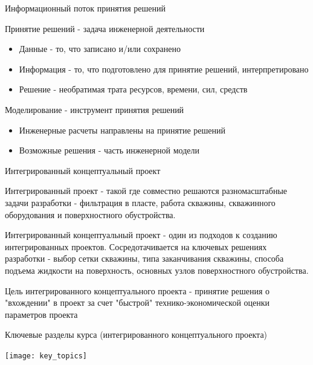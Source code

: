 \begin{frame}{Информационный поток принятия решений}
\begin{center}
    

Принятие решений - задача инженерной деятельности
\end{center}
\begin{itemize}
    \item Данные - то, что записано и/или сохранено
    \item Информация - то, что подготовлено для принятие решений, интерпретировано
    \item Решение - необратимая трата ресурсов, времени, сил, средств
\end{itemize}{}

\end{frame}

\begin{frame}{Моделирование - инструмент принятия решений}
\begin{center}
    
\end{center}
\begin{itemize}
    \item Инженерные расчеты направлены на принятие решений
    \item Возможные решения - часть инженерной модели
\end{itemize}{}

\end{frame}

\begin{frame}{Интегрированный концептуальный проект}

Интегрированный проект - такой где совместно решаются разномасштабные задачи разработки - фильтрация в пласте, работа скважины, скважинного оборудования и поверхностного обустройства.

Интегрированный концептуальный проект - один из подходов к созданию интегрированных проектов. Сосредотачивается на ключевых решениях разработки - выбор сетки скважины, типа заканчивания скважины, способа подъема жидкости на поверхность, основных узлов поверхностного обустройства.

Цель интегрированного концептуального проекта - принятие решения о "вхождении" в проект за счет "быстрой" технико-экономической оценки параметров проекта


\end{frame}




\begin{frame}{Ключевые разделы курса (интегрированного концептуального проекта)}

\begin{center}
    \texttt{[image: key\_topics]}
\end{center}

    
\end{frame}